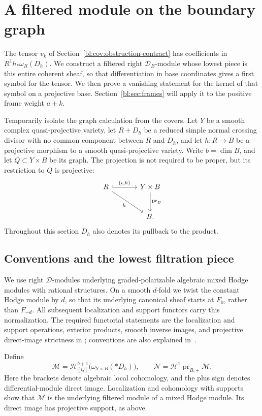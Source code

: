\section{A filtered module on the boundary graph}
\label{bl:sec:hodge}

The tensor $v_k$ of Section~\ref{bl:cov:obstruction-contract} has
coefficients in $R^1h_*\omega_R(D_h)$. We construct a filtered right
$\mathcal D_B$-module whose lowest piece is this entire coherent
sheaf, so that differentiation in base coordinates gives a first
symbol for the tensor. We then prove a vanishing statement for the
kernel of that symbol on a projective base. Section~\ref{bl:sec:frames}
will apply it to the positive frame weight $a+k$.

Temporarily isolate the graph calculation from the covers. Let $Y$ be
a smooth complex quasi-projective variety, let $R+D_h$ be
a reduced simple normal crossing divisor with no common component
between $R$ and $D_h$, and let $h:R\to B$ be a projective morphism
to a smooth quasi-projective variety. Write $b=\dim B$, and let
$Q\subset Y\times B$ be its graph. The projection is not required
to be proper, but its restriction to $Q$ is projective:
\[
\begin{tikzcd}[column sep=large,row sep=large]
R \arrow[r,hook,"{(\iota,h)}"] \arrow[dr,"h"'] &
Y\times B \arrow[d,"\operatorname{pr}_B"]\\
& B.
\end{tikzcd}
\]
Throughout this section $D_h$ also denotes its pullback to the product.

\subsection{Conventions and the lowest filtration piece}

We use right $\mathcal D$-modules underlying graded-polarizable
algebraic mixed Hodge modules with rational structures. On a smooth
$d$-fold we twist the constant Hodge module by $d$, so that its
underlying canonical sheaf starts at $F_0$, rather than $F_{-d}$.
All subsequent localization and support functors carry this
normalization. The required functorial statements are the
localization and support operations, exterior products, smooth
inverse images, and projective direct-image strictness in
\cite{Saito1988,Saito1990,Saito2013}; conventions are also explained
in~\cite{Schnell2014,Popa2016}.

Define
\begin{equation}\label{bl:hod:modules}
 \mathcal M=\mathcal H^{b+1}_{[Q]}
       \bigl(\omega_{Y\times B}(*D_h)\bigr),
 \qquad
 \mathcal N=\mathcal H^1\operatorname{pr}_{B,+}\mathcal M.
\end{equation}
Here the brackets denote algebraic local cohomology, and the plus
sign denotes differential-module direct image. Localization and
cohomology with supports show that $\mathcal M$ is the underlying
filtered module of a mixed Hodge module. Its direct image has
projective support, as above.

